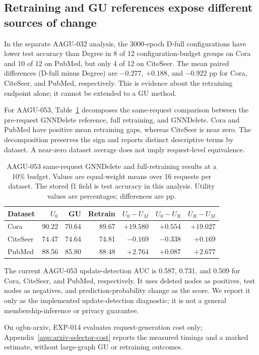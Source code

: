 \subsection{Retraining and GU references expose different sources of change}
In the separate AAGU-032 analysis, the 3000-epoch D-full configurations have lower test accuracy than Degree in 8 of 12 configuration-budget groups on Cora and 10 of 12 on PubMed, but only 4 of 12 on CiteSeer. The mean paired differences (D-full minus Degree) are $-0.277$, $+0.188$, and $-0.922$ pp for Cora, CiteSeer, and PubMed, respectively. This is evidence about the retraining endpoint alone; it cannot be extended to a GU method.

For AAGU-053, Table~\ref{tab:aagu053} decomposes the same-request comparison between the pre-request GNNDelete reference, full retraining, and GNNDelete. Cora and PubMed have positive mean retraining gaps, whereas CiteSeer is near zero. The decomposition preserves the sign and reports distinct descriptive terms by dataset. A near-zero dataset average does not imply request-level equivalence.

\begin{table}[t]
\centering
\small
\caption{AAGU-053 same-request GNNDelete and full-retraining results at a 10\% budget. Values are equal-weight means over 16 requests per dataset. The stored f1 field is test accuracy in this analysis. Utility values are percentages; differences are pp.}
\label{tab:aagu053}
\begin{tabular}{lrrrrrr}
\toprule
Dataset & $U_0$ & GU & Retrain & $U_0-U_M$ & $U_0-U_R$ & $U_R-U_M$ \\
\midrule
Cora & 90.22 & 70.64 & 89.67 & $+19.580$ & $+0.554$ & $+19.027$ \\
CiteSeer & 74.47 & 74.64 & 74.81 & $-0.169$ & $-0.338$ & $+0.169$ \\
PubMed & 88.56 & 85.80 & 88.48 & $+2.764$ & $+0.087$ & $+2.677$ \\
\bottomrule
\end{tabular}
\end{table}

The current AAGU-053 update-detection AUC is 0.587, 0.731, and 0.509 for Cora, CiteSeer, and PubMed, respectively. It uses deleted nodes as positives, test nodes as negatives, and prediction-probability change as the score. We report it only as the implemented update-detection diagnostic; it is not a general membership-inference or privacy guarantee.

On ogbn-arxiv, EXP-014 evaluates request-generation cost only; Appendix~\ref{app:arxiv-selector-cost} reports the measured timings and a marked estimate, without large-graph GU or retraining outcomes.
